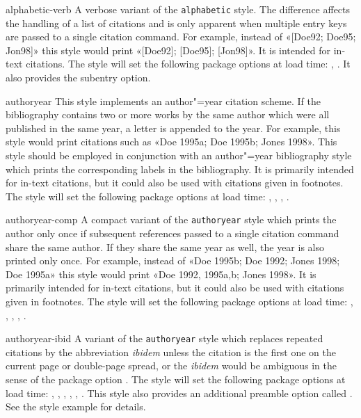 \documentclass{ltxdockit}[2011/03/25]
\begin{document}
\begin{marglist}
\item[alphabetic-verb]
A verbose variant of the \texttt{alphabetic} style. The difference affects the handling of a list of citations and is only apparent when multiple entry keys are passed to a single citation command. For example, instead of «[Doe92; Doe95; Jon98]» this style would print «[Doe92]; [Doe95]; [Jon98]». It is intended for in-text citations. The style will set the following package options at load time: , . It also provides the subentry option.

\item[authoryear]
This style implements an author"=year citation scheme. If the bibliography contains two or more works by the same author which were all published in the same year, a letter is appended to the year. For example, this style would print citations such as «Doe 1995a; Doe 1995b; Jones 1998». This style should be employed in conjunction with an author"=year bibliography style which prints the corresponding labels in the bibliography. It is primarily intended for in-text citations, but it could also be used with citations given in footnotes. The style will set the following package options at load time: , , , .

\item[authoryear-comp]
A compact variant of the \texttt{authoryear} style which prints the author only once if subsequent references passed to a single citation command share the same author. If they share the same year as well, the year is also printed only once. For example, instead of «Doe 1995b; Doe 1992; Jones 1998; Doe 1995a» this style would print «Doe 1992, 1995a,b; Jones 1998». It is primarily intended for in-text citations, but it could also be used with citations given in footnotes. The style will set the following package options at load time: , , , , .

\item[authoryear-ibid]
A variant of the \texttt{authoryear} style which replaces repeated citations by the abbreviation \emph{ibidem} unless the citation is the first one on the current page or double-page spread, or the \emph{ibidem} would be ambiguous in the sense of the package option . The style will set the following package options at load time: , , , , , . This style also provides an additional preamble option called . See the style example for details.


\end{marglist}
\end{document}
